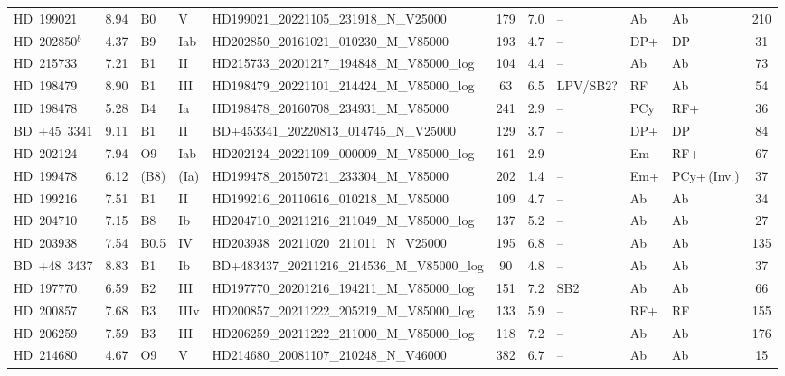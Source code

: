 {\begin{landscape}
\begin{longtable}{lclllcclllc}
\noalign{\smallskip}
HD~199021 & 8.94 & B0 & V & HD199021\_20221105\_231918\_N\_V25000 & 179 & 7.0 & -- & Ab & Ab & 210 \\
\noalign{\smallskip}
HD~202850$^{b}$ & 4.37 & B9 & Iab & HD202850\_20161021\_010230\_M\_V85000 & 193 & 4.7 & -- & DP+ & DP & 31 \\
\noalign{\smallskip}
HD~215733 & 7.21 & B1 & II & HD215733\_20201217\_194848\_M\_V85000\_log & 104 & 4.4 & -- & Ab & Ab & 73 \\
\noalign{\smallskip}
HD~198479 & 8.90 & B1 & III & HD198479\_20221101\_214424\_M\_V85000\_log & 63 & 6.5 & LPV/SB2? & RF & Ab & 54 \\
\noalign{\smallskip}
HD~198478 & 5.28 & B4 & Ia & HD198478\_20160708\_234931\_M\_V85000 & 241 & 2.9 & -- & PCy & RF+ & 36 \\
\noalign{\smallskip}
BD~+45~3341 & 9.11 & B1 & II & BD+453341\_20220813\_014745\_N\_V25000 & 129 & 3.7 & -- & DP+ & DP & 84 \\
\noalign{\smallskip}
HD~202124 & 7.94 & O9 & Iab & HD202124\_20221109\_000009\_M\_V85000\_log & 161 & 2.9 & -- & Em & RF+ & 67 \\
\noalign{\smallskip}
HD~199478 & 6.12 & (B8) & (Ia) & HD199478\_20150721\_233304\_M\_V85000 & 202 & 1.4 & -- & Em+ & PCy+\,(Inv.) & 37 \\
\noalign{\smallskip}
HD~199216 & 7.51 & B1 & II & HD199216\_20110616\_010218\_M\_V85000 & 109 & 4.7 & -- & Ab & Ab & 34 \\
\noalign{\smallskip}
HD~204710 & 7.15 & B8 & Ib & HD204710\_20211216\_211049\_M\_V85000\_log & 137 & 5.2 & -- & Ab & Ab & 27 \\
\noalign{\smallskip}
HD~203938 & 7.54 & B0.5 & IV & HD203938\_20211020\_211011\_N\_V25000 & 195 & 6.8 & -- & Ab & Ab & 135 \\
\noalign{\smallskip}
BD~+48~3437 & 8.83 & B1 & Ib & BD+483437\_20211216\_214536\_M\_V85000\_log & 90 & 4.8 & -- & Ab & Ab & 37 \\
\noalign{\smallskip}
HD~197770 & 6.59 & B2 & III & HD197770\_20201216\_194211\_M\_V85000\_log & 151 & 7.2 & SB2 & Ab & Ab & 66 \\
\noalign{\smallskip}
HD~200857 & 7.68 & B3 & IIIv & HD200857\_20211222\_205219\_M\_V85000\_log & 133 & 5.9 & -- & RF+ & RF & 155 \\
\noalign{\smallskip}
HD~206259 & 7.59 & B3 & III & HD206259\_20211222\_211000\_M\_V85000\_log & 118 & 7.2 & -- & Ab & Ab & 176 \\
\noalign{\smallskip}
HD~214680 & 4.67 & O9 & V & HD214680\_20081107\_210248\_N\_V46000 & 382 & 6.7 & -- & Ab & Ab & 15 \\

\end{longtable}
\end{landscape}}
